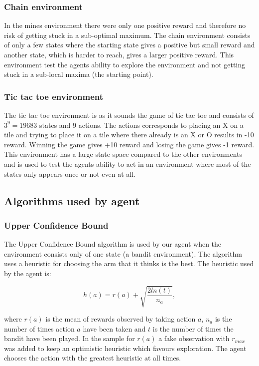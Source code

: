 \documentclass[11pt]{article}
\numberwithin{equation}{section}
\begin{document}
\begin{flushleft}
\subsubsection{Chain environment}

In the mines environment there were only one positive reward and therefore no risk of getting stuck in a sub-optimal maximum. The chain environment consists of only a few states where the starting state gives a positive but small reward and another state, which is harder to reach, gives a larger positive reward. This environment test the agents ability to explore the environment and not getting stuck in a sub-local maxima (the starting point).
\subsubsection{Tic tac toe environment}

The tic tac toe environment is as it sounds the game of tic tac toe and consists of $3^9=19683$ states and 9 actions. The actions corresponds to placing an X on a tile and trying to place it on a tile where there already is an X or O results in -10 reward. Winning the game gives +10 reward and losing the game gives -1 reward. This environment has a large state space compared to the other environments and is used to test the agents ability to act in an environment where most of the states only appears once or not even at all.
\subsection{Algorithms used by agent}

\subsubsection{Upper Confidence Bound}

The Upper Confidence Bound algorithm is used by our agent when the environment consists only of one state (a bandit environment). The algorithm uses a heuristic for choosing the arm that it thinks is the best. The heuristic used by the agent is:

$$h(a) = r(a) + \sqrt{\frac{2ln(t)}{n_a}},$$

where $r(a)$ is the mean of rewards observed by taking action $a$, $n_a$ is the number of times action $a$ have been taken and $t$ is the number of times the bandit have been played. In the sample for $r(a)$ a fake observation with $r_{max}$ was added to keep an optimistic heuristic which favours exploration. The agent chooses the action with the greatest heuristic at all times.


\end{flushleft}
\end{document}

